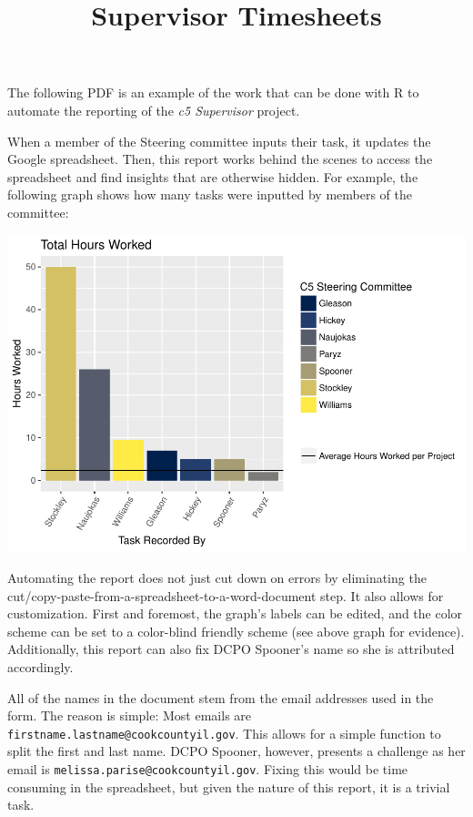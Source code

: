 \documentclass[]{article}
\title{Supervisor Timesheets}
\author{}
\date{}
\begin{document}
\maketitle

The following PDF is an example of the work that can be done with R to
automate the reporting of the \emph{c5 Supervisor} project.

When a member of the Steering committee inputs their task, it updates
the Google spreadsheet. Then, this report works behind the scenes to
access the spreadsheet and find insights that are otherwise hidden. For
example, the following graph shows how many tasks were inputted by
members of the committee:

\includegraphics{reports_files/figure-latex/hours_worked-1.pdf}

Automating the report does not just cut down on errors by eliminating
the cut/copy-paste-from-a-spreadsheet-to-a-word-document step. It also
allows for customization. First and foremost, the graph's labels can be
edited, and the color scheme can be set to a color-blind friendly scheme
(see above graph for evidence). Additionally, this report can also fix
DCPO Spooner's name so she is attributed accordingly.

All of the names in the document stem from the email addresses used in
the form. The reason is simple: Most emails are
\texttt{firstname.lastname@cookcountyil.gov}. This allows for a simple
function to split the first and last name. DCPO Spooner, however,
presents a challenge as her email is
\texttt{melissa.parise@cookcountyil.gov}. Fixing this would be time
consuming in the spreadsheet, but given the nature of this report, it is
a trivial task.
\end{document}

